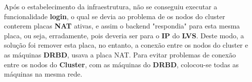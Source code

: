 \hspace{5mm} Após o estabelecimento da infraestrutura, não se conseguiu executar a funcionalidade \textbf{login}, o qual se devia ao problema de os nodos do cluster conterem placas \textbf{NAT} ativas, e assim o backend "respondia" para esta mesma placa, ou seja, erradamente, pois deveria ser para o \textbf{IP} do \textbf{LVS}. Deste modo, a solução foi remover esta placa, no entanto, a conexão entre os nodos do cluster e as máquinas \textbf{DRBD}, usava a placa NAT. Para evitar problemas de conexão entre os nodos do \textbf{Cluster}, com as máquinas do \textbf{DRBD}, colocou-se todas as máquinas na mesma rede.
